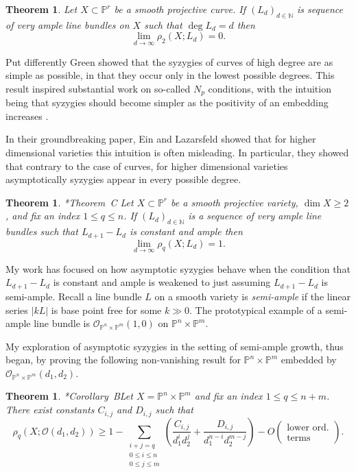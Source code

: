 \documentclass[10pt,reqno]{amsart}
\newtheorem{theorem}[lemma]{Theorem}
\theoremstyle{remark}
\renewcommand{\O}{\mathcal{O}}
\newcommand{\N}{\mathbb{N}}
\renewcommand{\P}{\mathbb{P}}
\begin{document}
\begin{theorem}\cite{green84-I}
Let $X\subset \P^r$ be a smooth projective curve. If $(L_{d})_{d\in\N}$ is sequence of very ample line bundles on $X$ such that $\deg L_{d} = d$ then 
\[
\lim_{d\to \infty} \rho_{2}\left(X;L_{d}\right) = 0.
\]
\end{theorem}

Put differently Green showed that the syzygies of curves of high degree are as simple as possible, in that they occur only in the lowest possible degrees. This result inspired substantial work on so-called $N_{p}$ conditions, with the intuition being that syzygies should become simpler as the positivity of an embedding increases \cite{ottavianiPaoletti01, einLazarsfeld93}.  

In their groundbreaking paper, Ein and Lazarsfeld showed that for higher dimensional varieties this intuition is often misleading. In particular, they showed that contrary to the case of curves, for higher dimensional varieties  asymptotically syzygies appear in every possible degree. 
  
\begin{theorem}\cite{einLazarsfeld12}*{Theorem~C}
Let $X\subset \P^r$ be a smooth projective variety, $\dim X \geq2$, and fix an index $1\leq q \leq n$. If $(L_{d})_{d\in\N}$ is a sequence of very ample line bundles such that $L_{d+1}-L_{d}$ is constant and ample then
\[
\lim_{d\to\infty} \rho_{q}\left(X; L_d\right) = 1.
\]
\end{theorem}

My work has focused on how asymptotic syzygies behave when the condition that $L_{d+1}-L_{d}$ is constant and ample is weakened to just assuming $L_{d+1}-L_{d}$ is semi-ample. Recall a line bundle $L$ on a smooth variety is \textit{semi-ample} if the linear series $|kL|$ is base point free for some $k\gg0$. The prototypical example of a semi-ample line bundle is $\O_{\P^{n}\times\P^{m}}(1,0)$ on $\P^{n}\times \P^{m}$. 

My exploration of asymptotic syzygies in the setting of semi-ample growth, thus began, by proving the following non-vanishing result for $\P^{n}\times\P^{m}$ embedded by $\O_{\P^{n}\times\P^{m}}(d_{1},d_{2})$. 

\begin{theorem}\cite{bruce19-semiample}*{Corollary~B}\label{thm:bruce-semiample}
Let $X=\P^{n}\times\P^{m}$ and fix an index $1\leq q \leq n+m$. There exist constants $C_{i,j}$ and $D_{i,j}$ such that
\[
\rho_{q}\left(X; \O\left(d_1,d_2\right)\right)\geq1-\sum_{\substack{i+j=q \\ 0\leq i \leq n \\ 0\leq j \leq m}}\left(
\frac{C_{i,j}}{d_1^id_2^j}+\frac{D_{i,j}}{d_1^{n-i}d_2^{m-j}}\right)-O\left(\begin{matrix}\text{lower ord.}\\ \text{terms}\end{matrix}\right).
\]
\end{theorem}
\end{document}
